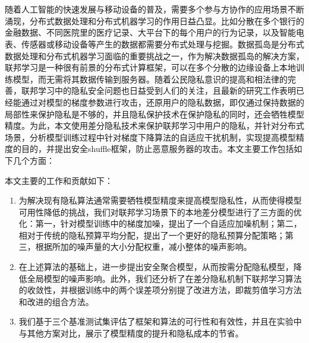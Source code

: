 \vspace{-2.5cm}
\chapter*{}

随着人工智能的快速发展与移动设备的普及，需要多个参与方协作的应用场景不断涌现，分布式数据处理和分布式机器学习的作用日益凸显。比如分散在多个银行的金融数据、不同医院里的医疗记录、大平台下的每个用户的行为记录，以及智能电表、传感器或移动设备等产生的数据都需要分布式处理与挖掘。数据孤岛是分布式数据处理和分布式机器学习面临的重要挑战之一，作为解决数据孤岛的解决方案，联邦学习是一种很有前景的分布式计算框架，可以在多个分散的边缘设备上本地训练模型，而无需将其数据传输到服务器。随着公民隐私意识的提高和相法律的完善，联邦学习中的隐私安全问题也日益受到人们的关注，且最新的研究工作表明已经能通过对模型的梯度参数进行攻击，还原用户的隐私数据，即仅通过保持数据的局部性来保护隐私是不够的，并且隐私保护技术在保护隐私的同时，还会牺牲模型精度。为此，本文使用差分隐私技术来保护联邦学习中用户的隐私，并针对分布式场景，分析模型训练过程中针对梯度下降算法的自适应干扰机制，实现提高模型精度的目的，并提出安全shuffle框架，防止恶意服务器的攻击。本文主要工作包括如下几个方面：

本文主要的工作和贡献如下：
\begin{enumerate}
	\item 为解决现有隐私算法通常需要牺牲模型精度来提高模型隐私性，从而使得模型可用性降低的挑战，我们对联邦学习场景下的本地差分模型进行了三方面的优化：第一，针对模型训练中的梯度加噪，提出了一个自适应加噪机制；第二，相对于传统的隐私预算平均分配，提出了一个更好的隐私预算分配策略；第三，根据所加的噪声量的大小分配权重，减小整体的噪声影响。
	\item 在上述算法的基础上，进一步提出安全聚合模型，从而按需分配隐私模型，降低全局模型的噪声影响。此外，我们还分析了在差分隐私机制下联邦学习算法的收敛性，并根据训练中的两个误差项分别提了改进方法，即裁剪值学习方法和改进的组合方法。
	\item 我们基于三个基准测试集评估了框架和算法的可行性和有效性，并且在实验中与其他方案对比，展示了模型精度的提升和隐私成本的节省。
\end{enumerate}
\hspace{-0.5cm}
 
